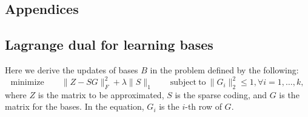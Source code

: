 \documentclass[12pt]{article}
\begin{document}
\newpage
\begin{appendices}
\section{Appendices}
  \subsection{Lagrange dual for learning bases}
  Here we derive the updates of bases $B$ in the problem defined by the following:
  \begin{equation*}
      \mathrm{minimize} \qquad \|Z - S G\|_F^2 + \lambda \|S\|_1 \qquad \mathrm{subject\  to}\ \|G_i\|_2^2 \leq 1, \forall i = 1, \dots, k, 
  \end{equation*} 
  where $Z$ is the matrix to be approximated, $S$ is the sparse coding, and $G$ is the matrix for the bases. In the equation, $G_i$ is the $i$-th row of $G$.


\end{appendices}
\end{document}
